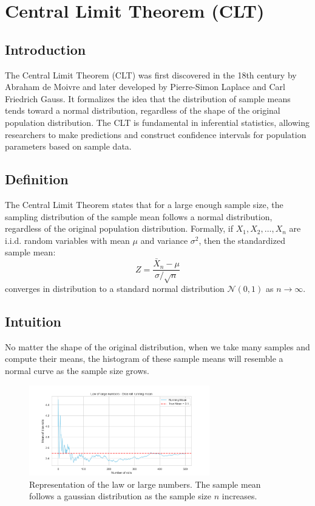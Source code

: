 \documentclass{book}
\begin{document}
\newpage

\section{Central Limit Theorem (CLT)}

\subsection*{Introduction}
The Central Limit Theorem (CLT) was first discovered in the 18th century by Abraham de Moivre and later developed by Pierre-Simon Laplace and Carl Friedrich Gauss. It formalizes the idea that the distribution of sample means tends toward a normal distribution, regardless of the shape of the original population distribution. The CLT is fundamental in inferential statistics, allowing researchers to make predictions and construct confidence intervals for population parameters based on sample data.

\subsection{Definition}
The Central Limit Theorem states that for a large enough sample size, the sampling distribution of the sample mean follows a normal distribution, regardless of the original population distribution. Formally, if $X_1, X_2, \dots, X_n$ are i.i.d. random variables with mean $\mu$ and variance $\sigma^2$, then the standardized sample mean:
\begin{equation}
    Z = \frac{\bar{X}_n - \mu}{\sigma / \sqrt{n}}
\end{equation}
converges in distribution to a standard normal distribution $\mathcal{N}(0,1)$ as $n \to \infty$.

\subsection{Intuition}
No matter the shape of the original distribution, when we take many samples and compute their means, the histogram of these sample means will resemble a normal curve as the sample size grows.

\begin{figure}[ht]
    \centering
    \includegraphics[width=0.7\textwidth]{figures/chapter3/law_large_numbers.png}
    \caption{Representation of the law or large numbers. The sample mean follows a gaussian distribution as the sample size $n$ increases.}
    \label{fig:random}
\end{figure}
\end{document}
